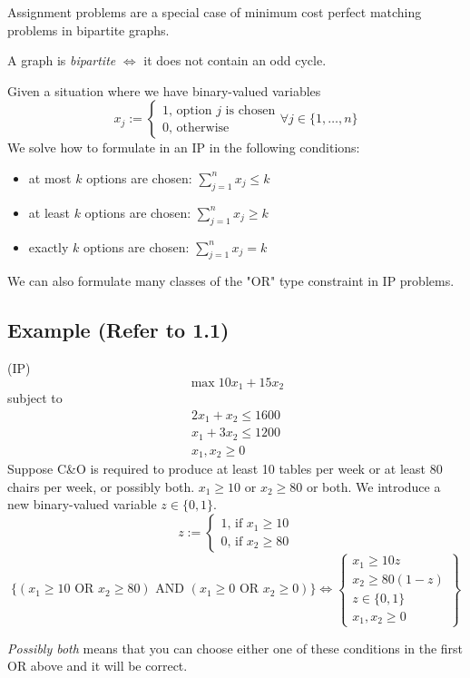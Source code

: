 Assignment problems are a special case of minimum cost perfect matching problems
in bipartite graphs.
\begin{remark}
    A graph is \emph{bipartite} $\iff$ it does not contain an odd cycle.
\end{remark}
Given a situation where we have binary-valued variables 
\[x_j:=
    \begin{cases}
        1 \text{, option $j$ is chosen}\\
        0 \text{, otherwise}
    \end{cases}
    \forall j\in\{1,\dots,n\}
\]
We solve how to formulate in an IP in the following conditions:
\begin{itemize}
    \item at most $k$ options are chosen: $\displaystyle\sum\limits_{j=1}^n x_j\le k$
    \item at least $k$ options are chosen: $\displaystyle\sum\limits_{j=1}^n x_j\ge k$
    \item exactly $k$ options are chosen: $\displaystyle\sum\limits_{j=1}^n x_j=k$
\end{itemize}
We can also formulate many classes of the "OR" type constraint in IP problems.

\subsection{Example (Refer to 1.1)}
(IP)
\[\max 10x_1 + 15x_2\]
subject to
\begin{align*}
    2x_1 + x_2 \le 1600\\
    x_1 + 3x_2 \le 1200\\
    x_1, x_2 \ge 0
\end{align*}
Suppose C\&O is required to produce at least 10 tables per week or at least 80
chairs per week, or possibly both. $x_1\ge 10$ or $x_2\ge 80$ or both. We
introduce a new binary-valued variable $z\in\{0,1\}$.
\[
    z:=
    \begin{cases}
        1 \text{, if } x_1\ge 10\\
        0 \text{, if } x_2\ge 80
    \end{cases}
\]
\[
   \{(x_1\ge 10 \text{ OR } x_2\ge 80) \text{ AND } 
   (x_1\ge 0 \text{ OR } x_2\ge 0)\}
    \iff
    \left\{\begin{array}{r}
        x_1\ge 10z\\
        x_2\ge 80(1-z)\\
        z\in\{0,1\}\\
        x_1,x_2\ge 0
    \end{array}\right\}
\]
\begin{remark}
    \emph{Possibly both} means that you can choose either one of these
    conditions in the first OR above and it will be correct.
\end{remark}

